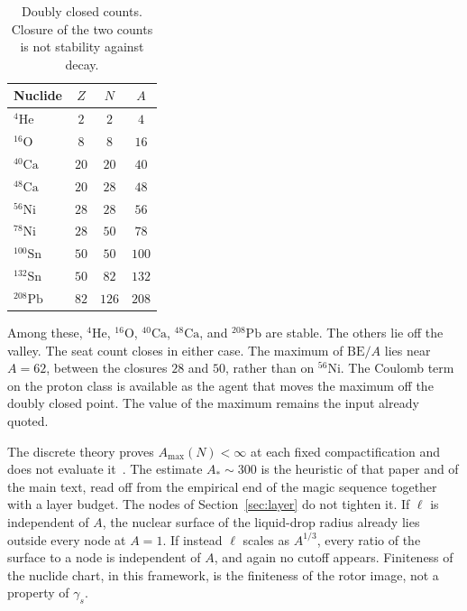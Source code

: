 \documentclass[a4paper]{article}
\begin{document}
\begin{table}[htbp]
\centering
\caption{Doubly closed counts. Closure of the two counts is not stability against decay.}
\label{tab:doubly}
\begin{tabular}{lccc}
\hline
Nuclide & \(Z\) & \(N\) & \(A\) \\
\hline
\({}^{4}\mathrm{He}\) & \(2\) & \(2\) & \(4\) \\
\({}^{16}\mathrm{O}\) & \(8\) & \(8\) & \(16\) \\
\({}^{40}\mathrm{Ca}\) & \(20\) & \(20\) & \(40\) \\
\({}^{48}\mathrm{Ca}\) & \(20\) & \(28\) & \(48\) \\
\({}^{56}\mathrm{Ni}\) & \(28\) & \(28\) & \(56\) \\
\({}^{78}\mathrm{Ni}\) & \(28\) & \(50\) & \(78\) \\
\({}^{100}\mathrm{Sn}\) & \(50\) & \(50\) & \(100\) \\
\({}^{132}\mathrm{Sn}\) & \(50\) & \(82\) & \(132\) \\
\({}^{208}\mathrm{Pb}\) & \(82\) & \(126\) & \(208\) \\
\hline
\end{tabular}
\end{table}

Among these, \({}^{4}\mathrm{He}\), \({}^{16}\mathrm{O}\), \({}^{40}\mathrm{Ca}\), \({}^{48}\mathrm{Ca}\), and \({}^{208}\mathrm{Pb}\) are stable. The others lie off the valley. The seat count closes in either case. The maximum of \(\mathrm{BE}/A\) lies near \(A=62\), between the closures \(28\) and \(50\), rather than on \({}^{56}\mathrm{Ni}\). The Coulomb term on the proton class is available as the agent that moves the maximum off the doubly closed point. The value of the maximum remains the input already quoted.

The discrete theory proves \(A_{\max}(N)<\infty\) at each fixed compactification and does not evaluate it~\cite{dst-dio}. The estimate \(A_*\sim 300\) is the heuristic of that paper and of the main text, read off from the empirical end of the magic sequence together with a layer budget. The nodes of Section~\ref{sec:layer} do not tighten it. If \(\ell\) is independent of \(A\), the nuclear surface of the liquid-drop radius already lies outside every node at \(A=1\). If instead \(\ell\) scales as \(A^{1/3}\), every ratio of the surface to a node is independent of \(A\), and again no cutoff appears. Finiteness of the nuclide chart, in this framework, is the finiteness of the rotor image, not a property of \(\gamma_s\).
\end{document}
